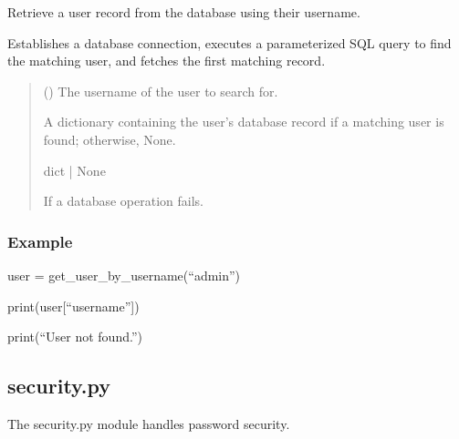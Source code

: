 \documentclass[letterpaper,10pt,english]{sphinxmanual}
\begin{document}
\begin{fulllineitems}
\label{\detokenize{modules:app.db.get_user_by_username}}
\pysigstartsignatures
\pysiglinewithargsret
{}
{}
{}
\pysigstopsignatures
\sphinxAtStartPar
Retrieve a user record from the database using their username.

\sphinxAtStartPar
Establishes a database connection, executes a parameterized SQL query
to find the matching user, and fetches the first matching record.
\begin{quote}\begin{description}
\sphinxAtStartPar
{} () \textendash{} The username of the user to search for.

\sphinxAtStartPar
A dictionary containing the user’s database record
if a matching user is found; otherwise, None.

\sphinxAtStartPar
dict | None

\sphinxAtStartPar
{} \textendash{} If a database operation fails.

\end{description}\end{quote}
\subsubsection*{Example}

\sphinxAtStartPar
user = get\_user\_by\_username(“admin”)
\begin{description}
\sphinxAtStartPar
print(user{[}“username”{]})

\sphinxAtStartPar
print(“User not found.”)

\end{description}

\end{fulllineitems}



\subsection{security.py}
\label{\detokenize{modules:security-py}}
\sphinxAtStartPar
The security.py module handles password security.
\end{document}
